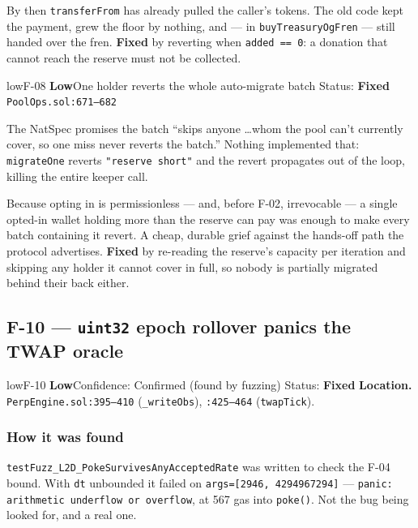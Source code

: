 \documentclass[11pt,a4paper]{article}
\newcommand{\code}[1]{\texttt{\small #1}}
\newcommand{\fileref}[1]{\texttt{\scriptsize #1}}
\begin{document}
By then \code{transferFrom} has already pulled the caller's tokens. The old code
kept the payment, grew the floor by nothing, and --- in \code{buyTreasuryOgFren} ---
still handed over the fren. \textbf{Fixed} by reverting when \code{added == 0}: a
donation that cannot reach the reserve must not be collected.

\begin{findingbox}{low}{F-08 \quad \textbf{Low}\quad One holder reverts the whole auto-migrate batch \quad Status: \textbf{Fixed}}
\fileref{PoolOps.sol:671--682}
\end{findingbox}

The NatSpec promises the batch ``skips anyone \dots whom the pool can't currently
cover, so one miss never reverts the batch.'' Nothing implemented that:
\code{migrateOne} reverts \code{"reserve short"} and the revert propagates out of
the loop, killing the entire keeper call.

Because opting in is permissionless --- and, before F-02, irrevocable --- a single
opted-in wallet holding more than the reserve can pay was enough to make every
batch containing it revert. A cheap, durable grief against the hands-off path the
protocol advertises. \textbf{Fixed} by re-reading the reserve's capacity per
iteration and skipping any holder it cannot cover in full, so nobody is partially
migrated behind their back either.

\newpage
\subsection{F-10 --- \texorpdfstring{\code{uint32}}{uint32} epoch rollover panics the TWAP oracle}

\begin{findingbox}{low}{F-10 \quad \textbf{Low}\quad Confidence: Confirmed (found by fuzzing) \quad Status: \textbf{Fixed}}
\textbf{Location.} \fileref{PerpEngine.sol:395--410} (\code{\_writeObs}),
\fileref{:425--464} (\code{twapTick}).
\end{findingbox}

\subsubsection*{How it was found}

\code{testFuzz\_L2D\_PokeSurvivesAnyAcceptedRate} was written to check the F-04
bound. With \code{dt} unbounded it failed on
\code{args=[2946, 4294967294]} --- \code{panic: arithmetic underflow or overflow},
at 567 gas into \code{poke()}. Not the bug being looked for, and a real one.
\end{document}
